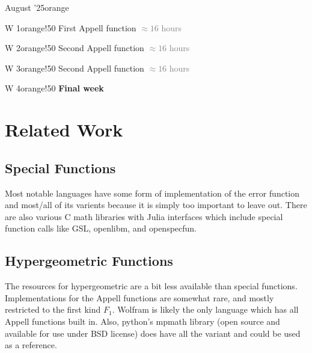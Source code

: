 \documentclass{article}
\newcommand{\release}[2]{%
        #1
        \hspace*{\fill}
        \textcolor{gray}{#2}\par}
\theoremstyle{mytheoremstyle}
\theoremstyle{mytheoremstyle}
\theoremstyle{myproblemstyle}
\begin{document}
      \begin{releaseyear}{August '25}{orange}
        \begin{releasequarter}{W 1}{orange!50}
          \release{First Appell function}{$\approx 16$  hours}
        \end{releasequarter}
        \begin{releasequarter}{W 2}{orange!50}
          \release{Second Appell function}{$\approx 16$  hours}
        \end{releasequarter}
        \begin{releasequarter}{W 3}{orange!50}
          \release{Second Appell function}{$\approx 16$  hours}
        \end{releasequarter}
        \begin{releasequarter}{W 4}{orange!50}
          \release{\textbf{Final week}}{}
        \end{releasequarter}
      \end{releaseyear}



  
  \section*{Related Work}\label{sec:Results} %
  \subsection*{Special Functions}\label{sub:Special Functions} %
   Most notable languages have some form of implementation of the error function and most/all of its varients because it is simply too important to leave out.
   There are also various C math libraries with Julia interfaces which include special function calls like GSL, openlibm, and openspecfun.

  

  \subsection*{Hypergeometric Functions}\label{sub:Hypergeometric Functions} %
    The resources for hypergeometric are a bit less available than special functions. 
    Implementations for the Appell functions are somewhat rare, and mostly restricted to the first kind $F_1$.
    Wolfram is likely the only language which has all Appell functions built in.
    Also, python's mpmath library (open source and available for use under BSD license) does have all the variant and could be used as a reference.
  
\end{document}

